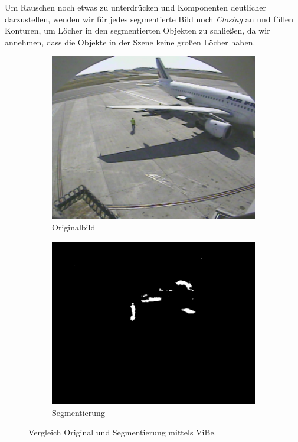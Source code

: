 \documentclass[]{scrartcl}
\begin{document}
Um Rauschen noch etwas zu unterdr\"ucken und Komponenten deutlicher darzustellen, wenden wir f\"ur jedes segmentierte Bild noch \textit{Closing} an und f\"ullen Konturen, um L\"ocher in den segmentierten Objekten zu schließen, da wir annehmen, dass die Objekte in der Szene keine gro\ss{}en L\"ocher haben.




\pagebreak

\begin{figure}[h!]
\centering
\begin{subfigure}{.5\textwidth}
  \centering
  \includegraphics[width=.8\linewidth]{S3A3202_0100.jpeg}
  \caption{Originalbild}
  \label{fig:orig}
\end{subfigure}%
\begin{subfigure}{.5\textwidth}
  \centering
  \includegraphics[width=.8\linewidth]{Seg_S3A3202_0100.jpeg}
  \caption{Segmentierung}
  \label{fig:seg}
\end{subfigure}
\caption{Vergleich Original und Segmentierung mittels ViBe.}
\label{fig:vergleich}
\end{figure}
\end{document}
